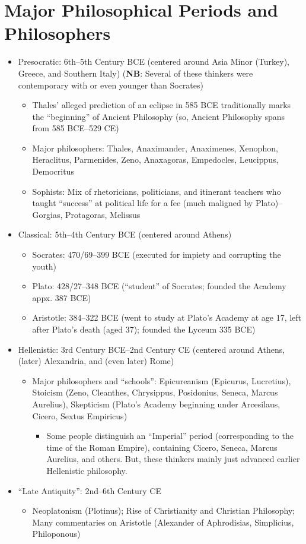 \documentclass[11pt]{article}
\begin{document}
\section*{Major Philosophical Periods and Philosophers}
\begin{itemize}
\item{Presocratic: 6th--5th Century BCE (centered around Asia Minor (Turkey), Greece, and Southern Italy) (\textbf{NB}: Several of these thinkers were contemporary with or even younger than Socrates)}
\begin{itemize}\item{Thales' alleged prediction of an eclipse in 585 BCE traditionally marks the ``beginning'' of Ancient Philosophy} (so, Ancient Philosophy spans from 585 BCE--529 CE)\end{itemize}
\begin{itemize}
\item{Major philosophers: Thales, Anaximander, Anaximenes, Xenophon, Heraclitus, Parmenides, Zeno, Anaxagoras, Empedocles, Leucippus, Democritus}
\item{Sophists: Mix of rhetoricians, politicians, and itinerant teachers who taught ``success'' at political life for a fee (much maligned by Plato)--Gorgias, Protagoras, Melissus}
\end{itemize}
\item{Classical: 5th--4th Century BCE (centered around Athens)}
\begin{itemize}
\item{Socrates: 470/69--399 BCE (executed for impiety and corrupting the youth)}\item{Plato: 428/27--348 BCE (``student'' of Socrates; founded the Academy appx. 387 BCE)}\item{Aristotle: 384--322 BCE (went to study at Plato's Academy at age 17, left after Plato's death (aged 37); founded the Lyceum 335 BCE)}
\end{itemize}
\item{Hellenistic: 3rd Century BCE--2nd Century CE (centered around Athens, (later) Alexandria, and (even later) Rome)}
\begin{itemize}
\item{Major philosophers and ``schools'': Epicureanism (Epicurus, Lucretius), Stoicism (Zeno, Cleanthes, Chrysippus, Posidonius, Seneca, Marcus Aurelius), Skepticism (Plato's Academy beginning under Arcesilaus, Cicero, Sextus Empiricus)}
\begin{itemize}\item{Some people distinguish an ``Imperial'' period (corresponding to the time of the Roman Empire), containing Cicero, Seneca, Marcus Aurelius, and others. But, these thinkers mainly just advanced earlier Hellenistic philosophy.}\end{itemize}
\end{itemize}
\item{``Late Antiquity'': 2nd--6th Century CE}
\begin{itemize}
\item{Neoplatonism (Plotinus); Rise of Christianity and Christian Philosophy; Many commentaries on Aristotle (Alexander of Aphrodisias, Simplicius, Philoponous)}
\end{itemize}
\end{itemize}
\end{document}
